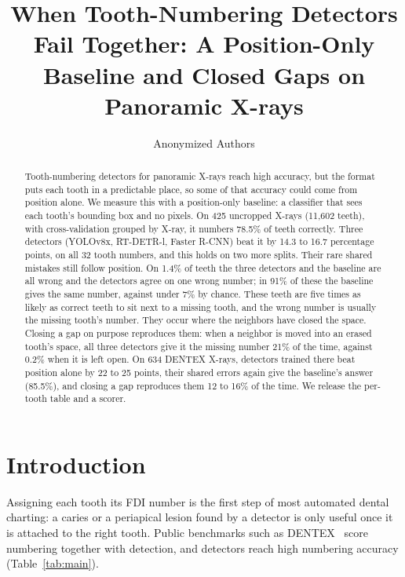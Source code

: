 \documentclass[runningheads]{llncs}
\begin{document}
\title{When Tooth-Numbering Detectors Fail Together: A Position-Only Baseline and Closed Gaps on Panoramic X-rays}
\author{Anonymized Authors}

\maketitle

\begin{abstract}
Tooth-numbering detectors for panoramic X-rays reach high accuracy, but the format puts each tooth in a predictable place, so some of that accuracy could come from position alone. We measure this with a
position-only baseline: a classifier that sees each tooth's bounding box and
no pixels. On 425 uncropped X-rays (11,602 teeth), with cross-validation grouped by X-ray, it numbers 78.5\% of teeth correctly.
Three detectors (YOLOv8x, RT-DETR-l, Faster R-CNN) beat
it by 14.3 to 16.7 percentage points, on all 32 tooth numbers, and this
holds on two more splits. Their rare shared mistakes still follow position.
On 1.4\% of teeth the three detectors and the baseline are all wrong and the
detectors agree on one wrong number; in 91\% of these the baseline gives the
same number, against under 7\% by chance. These teeth are five times as
likely as correct teeth to sit next to a missing tooth, and the wrong number
is usually the missing tooth's number. They occur where the neighbors have closed the space. Closing a gap on purpose reproduces them: when a neighbor is moved into an erased tooth's space, all three detectors give it the missing number 21\% of the time, against 0.2\% when it is left open. On 634 DENTEX X-rays, detectors trained there beat position alone by 22 to 25 points, their shared errors again give the baseline's answer (85.5\%), and closing a gap reproduces them 12 to 16\% of the time. We release the per-tooth table and a scorer.
\end{abstract}

\section{Introduction}

Assigning each tooth its FDI number is the first step of most automated
dental charting: a caries or a periapical lesion found by a detector is
only useful once it is attached to the right tooth. Public benchmarks such
as DENTEX~\cite{hamamci2023dentex} score numbering together with detection, and detectors reach high numbering accuracy (Table~\ref{tab:main}).
\end{document}
